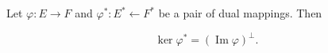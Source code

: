 Let $\varphi: E \rightarrow F$ and $\varphi^*: E^* \leftarrow F^*$ be a pair of dual mappings. Then

$$\ker \varphi^* = (\operatorname{Im} \varphi)^\perp.$$
